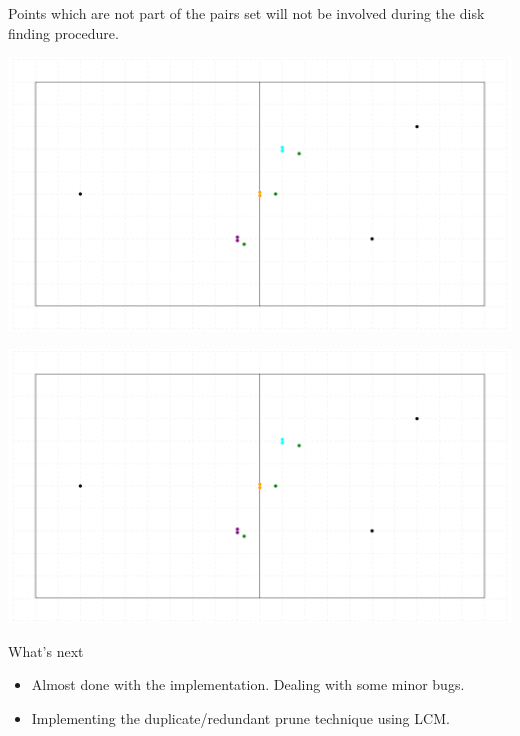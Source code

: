 \documentclass{beamer}
\begin{document}
\begin{frame}
  \begin{lemma}
    Points which are not part of the pairs set will not be involved during the disk finding procedure.
  \end{lemma}
\end{frame}
\begin{frame}
  \centering
  \vspace{-7pt}
  \includegraphics[page=1, scale=0.415]{figures/lema1}
\end{frame}
\begin{frame}
  \centering
  \vspace{-7pt}
  \includegraphics[page=2, scale=0.415]{figures/lema1}
\end{frame}

\begin{frame}{What's next}
    \begin{itemize}
    \item Almost done with the implementation.  Dealing with some minor bugs.
      \item Implementing the duplicate/redundant prune technique using LCM.
    \end{itemize}
\end{frame}
\end{document}

